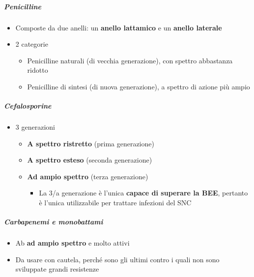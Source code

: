 \documentclass[italian,]{article}
\providecommand{\tightlist}{%
  \setlength{\itemsep}{0pt}\setlength{\parskip}{0pt}}
\begin{document}
\hypertarget{penicilline}{%
\subparagraph{Penicilline}\label{penicilline}}

\begin{itemize}
\tightlist
\item
  Composte da due anelli: un \textbf{anello lattamico} e un
  \textbf{anello laterale}
\item
  2 categorie

  \begin{itemize}
  \tightlist
  \item
    Penicilline naturali (di vecchia generazione), con spettro
    abbastanza ridotto
  \item
    Penicilline di sintesi (di nuova generazione), a spettro di azione
    più ampio
  \end{itemize}
\end{itemize}

\hypertarget{cefalosporine}{%
\subparagraph{Cefalosporine}\label{cefalosporine}}

\begin{itemize}
\tightlist
\item
  3 generazioni

  \begin{itemize}
  \tightlist
  \item
    \textbf{A spettro ristretto} (prima generazione)
  \item
    \textbf{A spettro esteso} (seconda generazione)
  \item
    \textbf{Ad ampio spettro} (terza generazione)

    \begin{itemize}
    \tightlist
    \item
      La 3/a generazione è l'unica \textbf{capace di superare la BEE},
      pertanto è l'unica utilizzabile per trattare infezioni del SNC
    \end{itemize}
  \end{itemize}
\end{itemize}

\hypertarget{carbapenemi-e-monobattami}{%
\subparagraph{Carbapenemi e
monobattami}\label{carbapenemi-e-monobattami}}

\begin{itemize}
\tightlist
\item
  Ab \textbf{ad ampio spettro} e molto attivi
\item
  Da usare con cautela, perché sono gli ultimi contro i quali non sono
  sviluppate grandi resistenze
\end{itemize}
\end{document}
